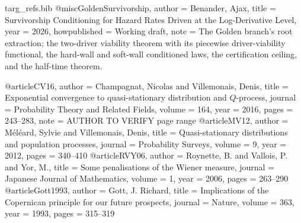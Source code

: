 \begin{filecontents}[overwrite]{targ_refs.bib}
@misc{GoldenSurvivorship,
  author       = {Benander, Ajax},
  title        = {Survivorship Conditioning for Hazard Rates Driven at the Log-Derivative Level},
  year         = {2026},
  howpublished = {Working draft},
  note         = {The Golden branch's root extraction; the two-driver viability
                  theorem with its piecewise driver-viability functional, the
                  hard-wall and soft-wall conditioned laws, the certification
                  ceiling, and the half-time theorem.}
}

@article{CV16,
  author  = {Champagnat, Nicolas and Villemonais, Denis},
  title   = {Exponential convergence to quasi-stationary distribution and {$Q$}-process},
  journal = {Probability Theory and Related Fields},
  volume  = {164},
  year    = {2016},
  pages   = {243--283},
  note    = {AUTHOR TO VERIFY page range}
}
@article{MV12,
  author  = {M{\'e}l{\'e}ard, Sylvie and Villemonais, Denis},
  title   = {Quasi-stationary distributions and population processes},
  journal = {Probability Surveys},
  volume  = {9},
  year    = {2012},
  pages   = {340--410}
}
@article{RVY06,
  author  = {Roynette, B. and Vallois, P. and Yor, M.},
  title   = {Some penalisations of the {W}iener measure},
  journal = {Japanese Journal of Mathematics},
  volume  = {1},
  year    = {2006},
  pages   = {263--290}
}
@article{Gott1993,
  author  = {Gott, J. Richard},
  title   = {Implications of the {C}opernican principle for our future prospects},
  journal = {Nature},
  volume  = {363},
  year    = {1993},
  pages   = {315--319}
}
\end{filecontents}
